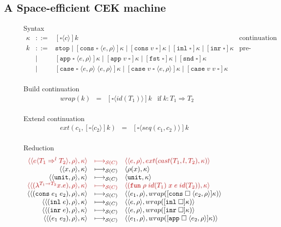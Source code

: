 \documentclass[acmsmall,review,anonymous]{acmart}\settopmatter{printfolios=true,printccs=false,printacmref=false}
\newcommand{\stxrule}[3]{#1 & ::= & #3 & \text{#2}\\}
\newcommand{\stxrulecont}[1]{& | & #1 & \\}
\newcommand{\funrule}[3]{#1 &=& #2 & #3\\}
\newcommand{\sOOinspect}[3]{\langle\langle#1,#2\rangle,#3\rangle}
\newcommand{\sOOreturn}[2]{\langle#1,#2\rangle}
\newcommand{\sOOhalt}[1]{\mathtt{Halt} \; #1}
\newcommand{\eOOvar}[1]{#1}
\newcommand{\eOOsole}[0]{\mathtt{unit}}
\newcommand{\eOOlam}[4]{\lambda^{#1\rightarrow{}#2}#3.#4}
\newcommand{\eOOapp}[2]{#1 \; #2}
\newcommand{\eOOcons}[2]{\mathtt{cons} \; #1 \; #2}
\newcommand{\eOOinl}[1]{\mathtt{inl} \; #1}
\newcommand{\eOOinr}[1]{\mathtt{inr} \; #1}
\newcommand{\eOOcast}[4]{#1 \langle \cOOcast{#2}{#3}{#4} \rangle}
\newcommand{\cOOcast}[3]{#1 \Rightarrow^{#2} #3}
\newcommand{\rOOsucc}[1]{\mathtt{succ}\;#1}
\newcommand{\rOOfail}[1]{\mathtt{fail}\;#1}
\newcommand{\kOOmt}[0]{\mathtt{stop}}
\newcommand{\kOOconsI}[3]{[\mathtt{cons} \; \square \; \langle#1,#2\rangle ]#3}
\newcommand{\kOOconsII}[2]{[\mathtt{cons} \; #1 \; \square]#2}
\newcommand{\kOOinl}[1]{[\mathtt{inl} \; \square]#1}
\newcommand{\kOOinr}[1]{[\mathtt{inr} \; \square]#1}
\newcommand{\kOOappI}[3]{
	[\mathtt{app} \; \square \; \langle#1,#2\rangle ]#3
}
\newcommand{\kOOappII}[2]{
	[\mathtt{app} \; #1 \; \square]#2}
\newcommand{\kOOcar}[1]{[\mathtt{fst} \; \square]#1}
\newcommand{\kOOcdr}[1]{[\mathtt{snd} \; \square]#1}
\newcommand{\kOOcaseI}[4]{
	[\mathtt{case} \; \square \; \langle#1,#3\rangle \; \langle#2,#3\rangle ]#4}
\newcommand{\kOOcaseII}[4]{
	[\mathtt{case} \; #1 \; \square \; \langle#2,#3\rangle ]#4}
\newcommand{\kOOcaseIII}[3]{
	[\mathtt{case} \; #1 \; #2 \; \square]#3}
\newcommand{\kOOcast}[2]{
	[\square \langle #1 \rangle]#2}
\newcommand{\hcvOOfun}[5]{\mathtt{fun} \; #2 \; #1 \; #3 \; #4 \; #5}
\newcommand{\hcvOOtt}[0]{\mathtt{unit}}
\newcommand{\sidecond}[1]{\text{if}\;#1}
\newcommand{\judgeSreduce}[3]{#2 \longmapsto_{\mathcal{S}(#1)} #3}
\newcommand{\redruleS}[3]{#1 & \longmapsto_{\mathcal{S}(C)} & #2 & #3\\}
\newcommand{\hiredruleS}[3]{\highlight{#1} & 
\highlight{\longmapsto_{\mathcal{S}(C)}} & \highlight{#2} & \highlight{#3} \\}
\newcommand{\ineffCEKD}{$\mathcal{D}$}
\newcommand{\highlight}[1]{{\color{red} #1}}
\begin{document}

\subsection{A Space-efficient CEK machine}
\label{sec:framework:cek}

\begin{figure}
	Syntax
	\[
	\begin{array}{rclr}
	\stxrule{\kappa}{continuation}{
		\kOOcast{c}{k}
	}
	\stxrule{k}{pre-continuations}{
		\kOOmt \mid{}
		\kOOconsI{e}{\rho}{\kappa} \mid
		\kOOconsII{v}{\kappa} \mid
		\kOOinl{\kappa} \mid
		\kOOinr{\kappa}
	}
	\stxrulecont{
		\kOOappI{e}{\rho}{\kappa} \mid
		\kOOappII{v}{\kappa} \mid
		\kOOcar{\kappa} \mid
		\kOOcdr{\kappa}
	}
	\stxrulecont{
		\kOOcaseI{e}{e}{\rho}{\kappa} \mid
		\kOOcaseII{v}{e}{\rho}{\kappa} \mid
		\kOOcaseIII{v}{v}{\kappa}
	}
	\end{array}
	\]
	
	Build continuation 
	\[
	\begin{array}{rclc}
	\funrule{wrap(k)}{\kOOcast{id(T_1)}{k}}{
		\sidecond{k : T_1 \Longrightarrow T_2}}
	\end{array}
	\]
	
	Extend continuation 
	\[
	\begin{array}{rclc}
	\funrule{ext(c_1,\kOOcast{c_2}{k})}{
		\kOOcast{seq(c_1,c_2)}{k}
	}{}
	\end{array}
	\]
	
	Reduction \fbox{$\judgeSreduce{C}{s}{s}$}
	\[
	\begin{array}{rclr}
	\hiredruleS{
		\sOOinspect{\eOOcast{e}{T_1}{l}{T_2}}{\rho}{\kappa}
	}{
		\sOOinspect{e}{\rho}{ext(cast(T_1,l,T_2),\kappa)}
	}{}
	\redruleS{
		\sOOinspect{\eOOvar{x}}{\rho}{\kappa}
	}{	
		\sOOreturn{\rho(x)}{\kappa}
	}{}
	\redruleS{
		\sOOinspect{\eOOsole}{\rho}{\kappa}
	}{
		\sOOreturn{\hcvOOtt}{\kappa}
	}{}
	\hiredruleS{
		\sOOinspect{(\eOOlam{T_1}{T_2}{x}{e})}{\rho}{\kappa}
	}{
		\sOOreturn{(\hcvOOfun{id(T_1)}{\rho}{x}{e}{id(T_2)})}{\kappa}
	}{}
	\redruleS{
		\sOOinspect{(\eOOcons{e_1}{e_2})}{\rho}{\kappa}
	}{
		\sOOinspect{e_1}{\rho}{
			wrap(\kOOconsI{e_2}{\rho}{\kappa})
		}
	}{}
	\redruleS{
		\sOOinspect{(\eOOinl{e})}{\rho}{\kappa}
	}{
		\sOOinspect{e}{\rho}{wrap(\kOOinl{\kappa})}
	}{}
	\redruleS{
		\sOOinspect{(\eOOinr{e})}{\rho}{\kappa}
	}{
		\sOOinspect{e}{\rho}{wrap(\kOOinr{\kappa})}
	}{}
	\redruleS{
		\sOOinspect{(\eOOapp{e_1}{e_2})}{\rho}{\kappa}
	}{
		\sOOinspect{e_1}{\rho}{wrap(\kOOappI{e_2}{\rho}{\kappa})}}{}
	

\end{array}\]
\end{figure}
\end{document}
